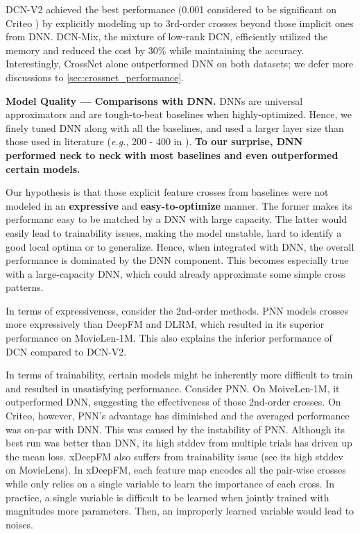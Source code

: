 \documentclass[sigconf]{acmart}
\begin{document}
{DCN-V2} achieved the best performance (0.001 considered to be significant on Criteo \cite{wang2017deep, lian2018xdeepfm, song2019autoint}) by explicitly modeling up to 3rd-order crosses beyond those implicit ones from DNN. {DCN-Mix}, the mixture of low-rank DCN, efficiently utilized the memory and reduced the cost by 30\% while maintaining the accuracy. Interestingly, CrossNet alone outperformed DNN on both datasets; we defer more discussions to \autoref{sec:crossnet_performance}.


{\bf Model Quality --- Comparisons with DNN.} DNNs are universal approximators and are tough-to-beat baselines when highly-optimized. Hence, we finely tuned DNN along with all the baselines, and used a larger layer size than those used in literature (\emph{e.g.}, 200 - 400 in \cite{lian2018xdeepfm, song2019autoint}). \textbf{To our surprise, DNN performed neck to neck with most baselines and even outperformed certain models.} 

Our hypothesis is that those explicit feature crosses from baselines were not modeled in an {\bf expressive} and {\bf easy-to-optimize} manner. The former makes its performanc easy to be matched by a DNN with large capacity. The latter would easily lead to trainability issues, making the model unstable, hard to identify a good local optima or to generalize. Hence, when integrated with DNN, the overall performance is dominated by the DNN component. This becomes especially true with a large-capacity DNN, which could already approximate some simple cross patterns.

In terms of expressiveness, consider the 2nd-order methods. PNN models crosses more expressively than DeepFM and DLRM, which resulted in its superior performance on MovieLen-1M. This also explains the inferior performance of DCN compared to {DCN-V2}.

In terms of trainability, certain models might be inherently more difficult to train and resulted in unsatisfying performance. Consider PNN. On MoiveLen-1M, it outperformed DNN, suggesting the effectiveness of those 2nd-order crosses. On Criteo, however, PNN's advantage has diminished and the averaged performance was on-par with DNN. This was caused by the instability of PNN. Although its best run was better than DNN, its high stddev from multiple trials has driven up the mean loss. xDeepFM also suffers from trainability issue (see its high stddev on MovieLens). In xDeepFM, each feature map encodes all the pair-wise crosses while only relies on a single variable to learn the importance of each cross. In practice, a single variable is difficult to be learned when jointly trained with magnitudes more parameters. Then, an improperly learned variable would lead to noises.
\end{document}
